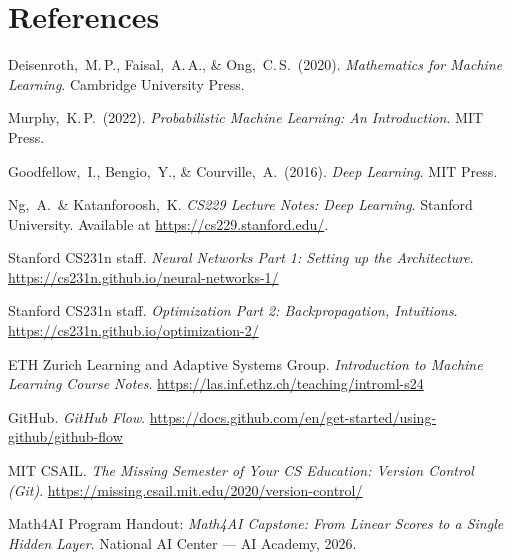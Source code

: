\documentclass[11pt]{article}
\begin{document}
\section*{References}
\begin{enumerate}[label={[\arabic*]},leftmargin=2em,itemsep=0.2em]
  \item Deisenroth,~M.\,P., Faisal,~A.\,A., \& Ong,~C.\,S.\ (2020). \textit{Mathematics
        for Machine Learning}. Cambridge University Press.
  \item Murphy,~K.\,P.\ (2022). \textit{Probabilistic Machine Learning: An Introduction}.
        MIT Press.
  \item Goodfellow,~I., Bengio,~Y., \& Courville,~A.\ (2016). \textit{Deep Learning}. MIT
        Press.
  \item Ng,~A.\ \& Katanforoosh,~K. \textit{CS229 Lecture Notes: Deep Learning}. Stanford
        University.  Available at \url{https://cs229.stanford.edu/}.
  \item Stanford CS231n staff. \textit{Neural Networks Part 1: Setting up the Architecture}.
        \url{https://cs231n.github.io/neural-networks-1/}
  \item Stanford CS231n staff. \textit{Optimization Part 2: Backpropagation, Intuitions}.
        \url{https://cs231n.github.io/optimization-2/}
  \item ETH Zurich Learning and Adaptive Systems Group. \textit{Introduction to Machine
        Learning Course Notes}.
        \url{https://las.inf.ethz.ch/teaching/introml-s24}
  \item GitHub. \textit{GitHub Flow}.
        \url{https://docs.github.com/en/get-started/using-github/github-flow}
  \item MIT CSAIL. \textit{The Missing Semester of Your CS Education: Version Control (Git)}.
        \url{https://missing.csail.mit.edu/2020/version-control/}
  \item Math4AI Program Handout: \textit{Math4AI Capstone: From Linear Scores to a Single
        Hidden Layer}. National AI Center --- AI Academy, 2026.
\end{enumerate}
\end{document}
